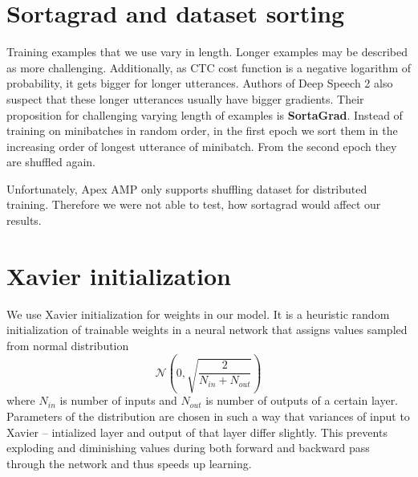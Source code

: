 \documentclass[licencjacka,en]{pracamgr}
\begin{document}
	
	

	
	
	\section{Sortagrad and dataset sorting}
	Training examples that we use vary in length. Longer examples may be described as more challenging. Additionally, as CTC cost function is a negative logarithm of probability, it gets bigger for longer utterances. Authors of Deep Speech 2 also suspect that these longer utterances usually have bigger gradients. Their proposition for challenging varying length of examples is \textbf{SortaGrad}. Instead of training on minibatches in random order, in the first epoch we sort them in the increasing order of longest utterance of minibatch. From the second epoch they are shuffled again.
	
	Unfortunately, Apex AMP only supports shuffling dataset for distributed training. Therefore we were not able to test, how sortagrad would affect our results.
	
	\xavier
	
	\section{Xavier initialization}
	We use Xavier initialization \cite{XAVIER} for weights in our model. It is a heuristic random initialization of trainable weights in a neural network that assigns values sampled from normal distribution $$\mathcal{N}\left(0, \sqrt{\frac{2}{N_{in} + N_{out}}}\right)$$ where $N_{in}$ is number of inputs and $N_{out}$ is number of outputs of a certain layer. Parameters of the distribution are chosen in such a way that variances of input to Xavier -- intialized layer and output of that layer differ slightly. This prevents exploding and diminishing values during both forward and backward pass through the network and thus speeds up learning.
	
\end{document}
